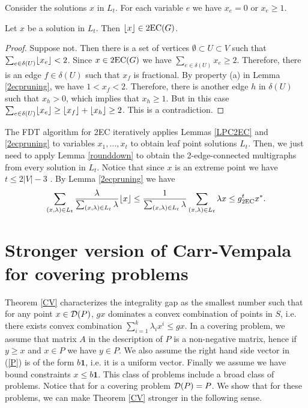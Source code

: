 \documentclass[runningheads]{llncs}
\begin{document}
Consider the solutions $x$ in $L_t$. For each variable $e$ we have $x_e=0$ or $x_e\geq 1$. 
\begin{lemma}\label{rounddown}
	Let $x$ be a solution in $L_t$. Then $\lfloor x\rfloor \in \operatorname{2EC}(G)$. 
\end{lemma}
\begin{proof}
	Suppose not. Then there is a set of vertices $\emptyset \subset U \subset V$ such that $\sum_{e\in \delta(U)}\lfloor x_e\rfloor<2$. Since $x\in \operatorname{2EC}(G)$ we have $\sum_{e\in \delta(U)}x_e \geq 2$. Therefore, there is an edge $f\in \delta(U)$ such that $x_f$ is fractional. By property (a) in Lemma \ref{2ecpruning}, we have $1<  x_f < 2$. Therefore, there is another edge $h$ in $\delta(U)$ such that $x_h>0$, which implies that $x_h\geq 1$. But in this case $\sum_{e\in \delta(U)}\lfloor x_e\rfloor\geq  \lfloor x_f\rfloor+\lfloor x_h\rfloor  \geq 2$. This is a contradiction.
\end{proof}

The FDT algorithm for 2EC iteratively applies Lemmas \ref{LPC2EC} and \ref{2ecpruning} to variables $x_1,\ldots,x_t$ to obtain leaf point solutions $L_t$. Then, we just need to apply Lemma \ref{rounddown} to obtain the 2-edge-connected multigraphs from every solution in $L_t$. Notice that since $x$ is an extreme point we have $t\leq 2|V|-3$ \cite{}. By Lemma \ref{2ecpruning} we have
\begin{align*}
	\sum_{(x,\lambda)\in L_t} \frac{\lambda}{\sum_{(x,\lambda)\in L_t}\lambda} \lfloor x\rfloor \leq \frac{1}{\sum_{(x,\lambda)\in L_t}\lambda} \sum_{(x,\lambda)\in L_t} \lambda {x} \leq g^t_{\operatorname{2EC}} x^*.
\end{align*}







\section{Stronger version of Carr-Vempala for covering problems} \label{gap}

Theorem \ref{CV} characterizes the integrality gap as the smallest number such that for any point $x\in \operatorname{\mathcal{D}}(P)$, $gx$ dominates a convex combination of points in $S$, i.e. there exists convex combination $\sum_{i=1}^{k}\lambda_ix^i \leq gx$.  In a covering problem, we assume that matrix $A$ in the description of $P$ is a non-negative matrix, hence if $y\geq x$ and $x\in P$ we have $y\in P$. We also assume the right hand side vector in (\ref{P}) is of the form $b\textbf{1}$, i.e. it is a uniform vector. Finally we assume we have bound constraints $x\leq b\textbf{1}$. This class of problems include a broad class of problems. Notice that for a covering problem $\operatorname{\mathcal{D}}(P)=P$.  We show that for these problems, we can make Theorem \ref{CV} stronger in the following sense. 
\end{document}
